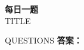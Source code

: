\documentclass[12pt,a5paper]{article}
\begin{document}
\begin{center}
\LARGE{\textbf{每日一题}}\\[0.3cm]
\large{{TITLE}}
\end{center}
{QUESTIONS}
\newpage
\textbf{答案：}
\end{document}
